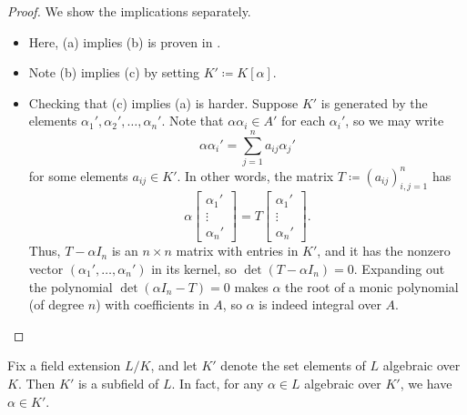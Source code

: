 \documentclass[../notes.tex]{subfiles}
\begin{document}
\begin{proof}
	We show the implications separately.
	\begin{itemize}
		\item Here, (a) implies (b) is proven in .
		\item Note (b) implies (c) by setting $K'\coloneqq K[\alpha]$.
		\item Checking that (c) implies (a) is harder. Suppose $K'$ is generated by the elements $\alpha_1',\alpha_2',\ldots,\alpha_n'$. Note that $\alpha\alpha_i\in A'$ for each $\alpha_i'$, so we may write
		\[\alpha\alpha_i'=\sum_{j=1}^na_{ij}\alpha_j'\]
		for some elements $a_{ij}\in K'$. In other words, the matrix $T\coloneqq(a_{ij})_{i,j=1}^n$ has
		\[\alpha\begin{bmatrix}
			\alpha_1' \\
			\vdots \\
			\alpha_n'
		\end{bmatrix}=T\begin{bmatrix}
			\alpha_1' \\
			\vdots \\
			\alpha_n'
		\end{bmatrix}.\]
		Thus, $T-\alpha I_n$ is an $n\times n$ matrix with entries in $K'$, and it has the nonzero vector $(\alpha_1',\ldots,\alpha_n')$ in its kernel, so $\det(T-\alpha I_n)=0$. Expanding out the polynomial $\det(\alpha I_n-T)=0$ makes $\alpha$ the root of a monic polynomial (of degree $n$) with coefficients in $A$, so $\alpha$ is indeed integral over $A$.
		\qedhere
	\end{itemize}
\end{proof}
\begin{corollary}
	Fix a field extension $L/K$, and let $K'$ denote the set elements of $L$ algebraic over $K$. Then $K'$ is a subfield of $L$. In fact, for any $\alpha\in L$ algebraic over $K'$, we have $\alpha\in K'$.
\end{corollary}
\end{document}
